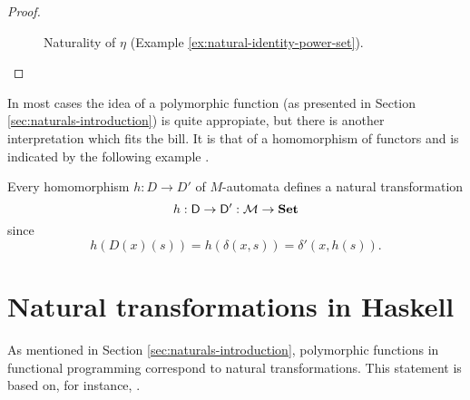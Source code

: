 \begin{example}
\begin{proof}
\begin{figure}[htbp]
\begin{center}
      \end{center}
      \caption{Naturality of $\eta$ (Example \ref{ex:natural-identity-power-set}).}
      \label{fig:naturality-eta}
    \end{figure}
  \end{proof}

\end{example}

In most cases the idea of a polymorphic function (as presented in
Section \ref{sec:naturals-introduction}) is quite appropiate, but
there is another interpretation which fits the bill. It is that of a
homomorphism of functors and is indicated by the following example
\parencite[page 436]{poigne-1992}.


\begin{example}
  [Automata]

  \label{ex:natural-automata}


  Every homomorphism $h: D \to D'$ of $M$-automata defines a natural
  transformation
  \begin{equation*}
    h: \mathsf{D} \to \mathsf{D'}: \mathcal{M} \to \mathbf{Set}
  \end{equation*}
  since
  \begin{equation*}
    h(D(x)(s)) = h(\delta(x,s)) = \delta'(x,h(s))
    \text{.}
  \end{equation*}

\end{example}

\section{Natural transformations in Haskell}
\label{sec:naturals-haskell}


As mentioned in Section \ref{sec:naturals-introduction}, polymorphic
functions in functional programming correspond to natural
transformations. This statement is based on, for instance,
\parencites[34]{bird-demoor-1997}[78]{elkins-2009}[435, 436]{poigne-1992}[48,
  49]{rydeheard-1986}[113]{rydeheard-1988}[350]{wadler-1989}.

